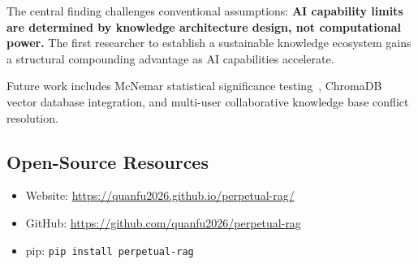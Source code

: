\documentclass[conference]{IEEEtran}
\begin{document}
The central finding challenges conventional assumptions: \textbf{AI capability
limits are determined by knowledge architecture design, not computational
power.} The first researcher to establish a sustainable knowledge ecosystem
gains a structural compounding advantage as AI capabilities accelerate.

Future work includes McNemar statistical significance testing~\cite{gao2024rag},
ChromaDB vector database integration, and multi-user collaborative knowledge
base conflict resolution.

\subsection*{Open-Source Resources}

\begin{itemize}
  \item Website: \url{https://quanfu2026.github.io/perpetual-rag/}
  \item GitHub: \url{https://github.com/quanfu2026/perpetual-rag}
  \item pip: \texttt{pip install perpetual-rag}
\end{itemize}



\end{document}
